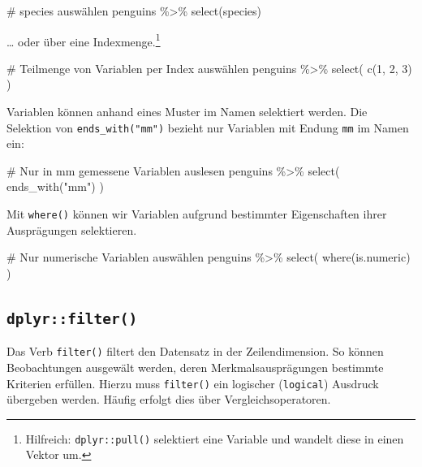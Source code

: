 \documentclass[
  a4paper,
  DIV=11,
  oneside]{scrreprt}
\newenvironment{Shaded}{\begin{snugshade}}{\end{snugshade}}
\newcommand{\NormalTok}[1]{\textcolor[rgb]{0.00,0.23,0.31}{#1}}
\begin{document}
\begin{Shaded}
\begin{Highlighting}[]
\NormalTok{\# \textquotesingle{}species\textquotesingle{} auswählen}
\NormalTok{penguins \%\textgreater{}\% }
\NormalTok{  select(species)}
\end{Highlighting}
\end{Shaded}

\ldots{} oder über eine Indexmenge.\footnote{Hilfreich:
  \texttt{dplyr::pull()} selektiert eine Variable und wandelt diese in
  einen Vektor um.}

\begin{Shaded}
\begin{Highlighting}[]
\NormalTok{\# Teilmenge von Variablen per Index auswählen}
\NormalTok{penguins \%\textgreater{}\% }
\NormalTok{  select(}
\NormalTok{    c(1, 2, 3)}
\NormalTok{  )}
\end{Highlighting}
\end{Shaded}

Variablen können anhand eines Muster im Namen selektiert werden. Die
Selektion von \texttt{ends\_with("mm")} bezieht nur Variablen mit Endung
\texttt{mm} im Namen ein:

\begin{Shaded}
\begin{Highlighting}[]
\NormalTok{\# Nur in mm gemessene Variablen auslesen}
\NormalTok{penguins \%\textgreater{}\% }
\NormalTok{  select(}
\NormalTok{    ends\_with("mm")}
\NormalTok{  )}
\end{Highlighting}
\end{Shaded}

Mit \texttt{where()} können wir Variablen aufgrund bestimmter
Eigenschaften ihrer Ausprägungen selektieren.

\begin{Shaded}
\begin{Highlighting}[]
\NormalTok{\# Nur numerische Variablen auswählen}
\NormalTok{penguins \%\textgreater{}\% }
\NormalTok{  select(}
\NormalTok{    where(is.numeric)}
\NormalTok{  )}
\end{Highlighting}
\end{Shaded}

\subsection{\texorpdfstring{\texttt{dplyr::filter()}}{dplyr::filter()}}\label{dplyrfilter}

Das Verb \texttt{filter()} filtert den Datensatz in der Zeilendimension.
So können Beobachtungen ausgewält werden, deren Merkmalsausprägungen
bestimmte Kriterien erfüllen. Hierzu muss \texttt{filter()} ein
logischer (\texttt{logical}) Ausdruck übergeben werden. Häufig erfolgt
dies über Vergleichsoperatoren.
\end{document}
